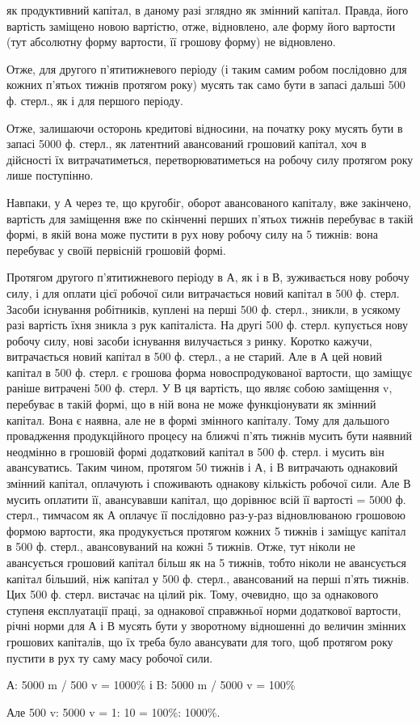 \parcont{}  %
як продуктивний капітал, в даному разі зглядно як змінний капітал.
Правда, його вартість заміщено новою вартістю, отже, відновлено, але
форму його вартости (тут абсолютну форму вартости, її грошову форму)
не відновлено.

Отже, для другого п’ятитижневого періоду (і таким самим робом
послідовно для кожних п’ятьох тижнів протягом року) мусять так
само бути в запасі дальші 500 ф. стерл., як і для першого періоду.

Отже, залишаючи осторонь кредитові відносини, на початку року мусять
бути в запасі 5000 ф. стерл., як латентний авансований грошовий капітал,
хоч в дійсності їх витрачатиметься, перетворюватиметься на робочу
силу протягом року лише поступінно.

Навпаки, у А через те, що кругобіг, оборот авансованого капіталу,
вже закінчено, вартість для заміщення вже по скінченні перших п’ятьох
тижнів перебуває в такій формі, в якій вона може пустити в рух нову
робочу силу на 5 тижнів: вона перебуває у своїй первісній грошовій формі.

Протягом другого п’ятитижневого періоду в А, як і в В, зуживається
нову робочу силу, і для оплати цієї робочої сили витрачається новий капітал
в 500 ф. стерл. Засоби існування робітників, куплені на перші 500 ф.
стерл., зникли, в усякому разі вартість їхня зникла з рук капіталіста.
На другі 500 ф. стерл. купується нову робочу силу, нові засоби існування
вилучається з ринку. Коротко кажучи, витрачається новий капітал в 500 ф.
стерл., а не старий. Але в А цей новий капітал в 500 ф. стерл. є грошова
форма новоспродукованої вартости, що заміщує раніше витрачені 500 ф.
стерл. У В ця вартість, що являє собою заміщення v, перебуває в такій
формі, що в ній вона не може функціонувати як змінний капітал. Вона є
наявна, але не в формі змінного капіталу. Тому для дальшого провадження
продукційного процесу на ближчі п’ять тижнів мусить бути наявний неодмінно
в грошовій формі додатковий капітал в 500 ф. стерл. і мусить він авансуватись.
Таким чином, протягом 50 тижнів і А, і В витрачають однаковий
змінний капітал, оплачують і споживають однакову кількість робочої сили.
Але В мусить оплатити її, авансувавши капітал, що дорівнює всій її
вартості = 5000 ф. стерл., тимчасом як А оплачує її послідовно раз-у-раз
відновлюваною грошовою формою вартости, яка продукується протягом
кожних 5 тижнів і заміщує капітал в 500 ф. стерл., авансовуваний на кожні
5 тижнів. Отже, тут ніколи не авансується грошовий капітал більш як
на 5 тижнів, тобто ніколи не авансується капітал більший, ніж капітал
у 500 ф. стерл., авансований на перші п’ять тижнів. Цих 500 ф. стерл. вистачає
на цілий рік. Тому, очевидно, що за однакового ступеня експлуатації
праці, за однакової справжньої норми додаткової вартости, річні
норми для А і В мусять бути у зворотному відношенні до величин змінних
грошових капіталів, що їх треба було авансувати для того, щоб
протягом року пустити в рух ту саму масу робочої сили.

А: 5000 m / 500 v = 1000\% і B: 5000 m / 5000 v = 100\%

Але 500 v: 5000 v = 1: 10 = 100\%: 1000\%.
